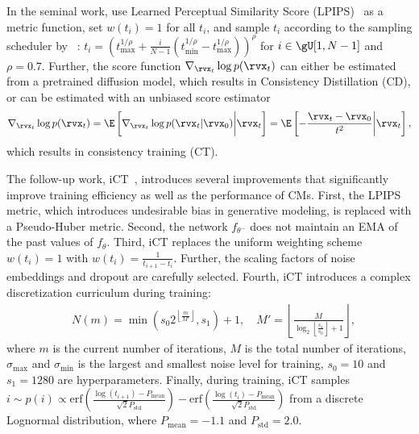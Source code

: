 \documentclass{article}
\begin{document}
In the seminal work, \citep{cm} use Learned Perceptual Similarity Score (LPIPS)~\citep{lpips} as a metric function, set $w(t_i) = 1$ for all  $t_i$, and sample $t_i$ according to the sampling scheduler by ~\citep{Karras2022edm}:
$t_i = \left(t_{\text{max}}^{1/\rho} + \frac{i}{N-1}(t_{\text{min}}^{1/\rho} - t_{\text{max}}^{1/\rho})\right)^\rho$ for $i \in \gU[1, N-1]$ and $\rho=0.7$. Further, the score function 
$\nabla_{\x_{t}} \log p(\x_t)$
 can either be estimated from a pretrained diffusion model,
%
which results in Consistency Distillation (CD), 
or can be estimated with an unbiased score estimator 
\begin{equation}
\label{score-est}
\nabla_{\x_{t}} \log p(\x_{t})
= \E\left[\nabla_{\x_{t}} \log p(\rvx_{t} | \rvx_{0}) \bigg\vert \rvx_t\right]
= \E\left[- \frac{\rvx_t - \rvx_0}{t^2} \bigg\vert \rvx_t\right],
\end{equation}
%
which results in consistency training (CT).

The follow-up work, iCT~\citep{ict}, introduces several improvements that significantly improve training efficiency as well as the performance of CMs. 
%
First, the LPIPS metric, which introduces undesirable bias in generative modeling, is replaced with a Pseudo-Huber metric. 
%
Second, the network  $f_{\theta^-}$ does not maintain an EMA of the past values of $f_\theta$. Third, iCT replaces the uniform weighting scheme $w(t_i) = 1$ with $w(t_i) = \frac{1}{t_{i+1} - t_i}$. 
%
Further, the scaling factors of noise embeddings and dropout are carefully selected. 
%
Fourth, iCT introduces a complex discretization curriculum during training:
%
\begin{equation}
\label{schedule}
\begin{aligned}
& N(m) = \min(s_0 2^{\left\lfloor \frac{m}{M'} \right\rfloor}, s_1) + 1, \quad M' = \left\lfloor \frac{ M }{\log_2 \left\lfloor \frac{s_1}{s_0} \right\rfloor + 1} \right\rfloor,
\end{aligned}
\end{equation}
%
where $m$ is the current number of iterations, $M$ is the total number of iterations, $\sigma_{\max}$ and $\sigma_{\min}$ is the largest and smallest noise level for training, $s_0 = 10$ and $s_1 = 1280$ are hyperparameters.
Finally, during training, iCT samples $i \sim p(i) \propto
\text{erf} \left( \frac{\log(t_{i+1}) - P_{\text{mean}}}{\sqrt{2} P_{\text{std}}} \right) -
\text{erf} \left( \frac{\log(t_i) - P_{\text{mean}}}{\sqrt{2} P_{\text{std}}} \right)$ from a discrete Lognormal distribution, where $P_{\text{mean}} = -1.1$ and $P_{\text{std}}=2.0$. 
\end{document}
